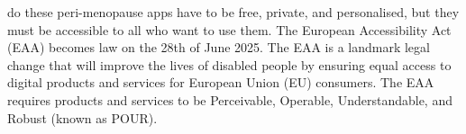 do these peri-menopause apps have to be free, private, and personalised, but they must be accessible to all who want to use them. The European Accessibility Act (EAA) becomes law on the 28th of June 2025. The EAA is a landmark legal change that will improve the lives of disabled people by ensuring equal access to digital products and services for European Union (EU) consumers\cite{AbilityNet2024}. The EAA requires products and services to be Perceivable, Operable, Understandable, and Robust (known as POUR). 
